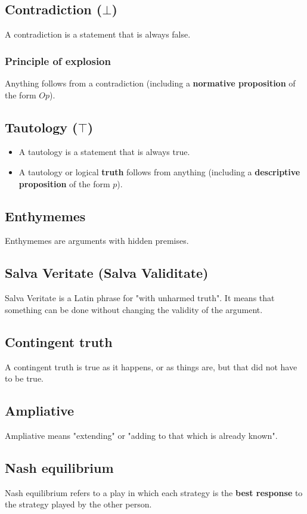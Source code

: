 \documentclass[11pt]{article}
\begin{document}
\subsection{Contradiction (\(\bot\))}
\label{sec:org07d5e5f}
A contradiction is a statement that is always false.
\subsubsection{Principle of explosion}
\label{sec:orgd7cb623}
Anything follows from a contradiction (including a \textbf{normative proposition} of the form \(Op\)).
\subsection{Tautology (\(\top\))}
\label{sec:orgb86e60e}
\begin{itemize}
\item A tautology is a statement that is always true.
\item A tautology or logical \textbf{truth} follows from anything (including a \textbf{descriptive proposition} of the form \(p\)).
\end{itemize}
\subsection{Enthymemes}
\label{sec:org29fb51a}
Enthymemes are arguments with hidden premises.
\subsection{Salva Veritate (Salva Validitate)}
\label{sec:org654d8bf}
Salva Veritate is a Latin phrase for "with unharmed truth". It means that something can be done without changing the validity of the argument.
\subsection{Contingent truth}
\label{sec:org05b371c}
A contingent truth is true as it happens, or as things are, but that did not have to be true.
\subsection{Ampliative}
\label{sec:orgafac63d}
Ampliative means "extending" or "adding to that which is already known".

 \newpage
\subsection{Nash equilibrium}
\label{sec:org11537ef}
Nash equilibrium refers to a play in which each strategy is the \textbf{best response} to the strategy played by the other person.
\end{document}
